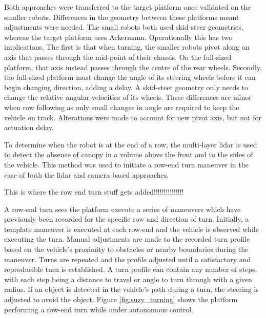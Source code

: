 \documentclass[preprint,authoryear,12pt]{elsarticle}
\begin{document}
    Both approaches were transferred to the target platform once validated on the smaller robots.
    Differences in the geometry between these platforms meant adjustments were needed.
    The small robots both used skid-steer geometries, whereas the target platform uses Ackermann.
    Operationally this has two implications.
    The first is that when turning, the smaller robots pivot along an axis that passes through the mid-point of their chassis.
    On the full-sized platform, that axis instead passes through the centre of the rear wheels.
    Secondly, the full-sized platform must change the angle of its steering wheels before it can begin changing direction, adding a delay.
    A skid-steer geometry only needs to change the relative angular velocities of its wheels.
    These differences are minor when row following as only small changes in angle are required to keep the vehicle on track.
    Alterations were made to account for new pivot axis, but not for actuation delay.

    To determine when the robot is at the end of a row, the multi-layer lidar is used to detect the absence of canopy in a volume above the front and to the sides of the vehicle.
    This method was used to initiate a row-end turn maneuver in the case of both the lidar and camera based approaches.

    \color{red} This is where the row end turn stuff gets added!!!!!!!!!!!!!!! \color{black}

    A row-end turn sees the platform execute a series of maneuvers which have previously been recorded for the specific row and direction of turn.
    Initially, a template maneuver is executed at each row-end and the vehicle is observed while executing the turn.
    Manual adjustments are made to the recorded turn profile based on the vehicle's proximity to obstacles or nearby boundaries during the maneuver.
    Turns are repeated and the profile adjusted until a satisfactory and reproducible turn is established.
    A turn profile can contain any number of steps, with each step being a distance to travel or angle to turn through with a given radius.
    If an object is detected in the vehicle's path during a turn, the steering is adjusted to avoid the object.
    Figure \ref{fig:suzy_turning} shows the platform performing a row-end turn while under autonomous control.
\end{document}
